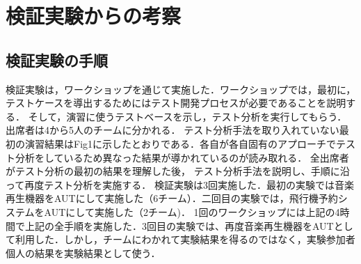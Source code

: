 \documentclass[a4paper,12pt]{jreport}
\begin{document}
\section{検証実験からの考察}
\subsection{検証実験の手順}

検証実験は，ワークショップを通じて実施した．ワークショップでは，最初に，テストケースを導出するためにはテスト開発プロセスが必要であることを説明する．
そして，演習に使うテストベースを示し，テスト分析を実行してもらう．出席者は4から5人のチームに分かれる．
テスト分析手法を取り入れていない最初の演習結果はFig1に示したとおりである．各自が各自固有のアプローチでテスト分析をしているため異なった結果が導かれているのが読み取れる．
全出席者がテスト分析の最初の結果を理解した後， テスト分析手法を説明し、手順に沿って再度テスト分析を実施する．
検証実験は3回実施した．最初の実験では音楽再生機器をAUTにして実施した（6チーム）．二回目の実験では，飛行機予約システムをAUTにして実施した（2チーム)．
1回のワークショップには上記の4時間で上記の全手順を実施した．3回目の実験では、再度音楽再生機器をAUTとして利用した．しかし，チームにわかれて実験結果を得るのではなく，実験参加者個人の結果を実験結果として使う．
\end{document}
